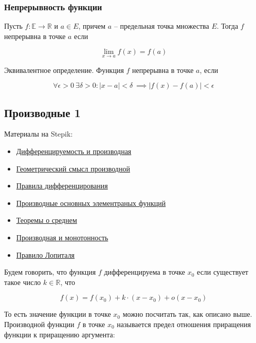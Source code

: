 \documentclass{article}
\begin{document}
\subsubsection{Непрерывность функции}

Пусть $f : \mathbb{E} \to \mathbb{R}$ и $a \in E$, причем $a$ -- предельная точка множества $E$. Тогда $f$ непрерывна в точке $a$ если

$$ \lim\limits_{x \to a} f(x) = f(a) $$

Эквивалентное определение. Функция $f$ непрерывна в точке $a$, если

$$ \forall \epsilon > 0 \ \exists \delta > 0 : |x - a| < \delta \ \implies |f(x) - f(a)| < \epsilon $$

\subsection{Производные 1}

Материалы на Stepik:

\begin{itemize}
	\item \href{https://stepik.org/lesson/28380/step/1}{Дифференцируемость и производная}
	\item \href{https://stepik.org/lesson/28380/step/4}{Геометрический смысл производной}
	\item \href{https://stepik.org/lesson/28380/step/6}{Правила дифференцирования}
	\item \href{https://stepik.org/lesson/28380/step/8}{Производные основных элементраных функций}
	\item \href{https://stepik.org/lesson/28369/step/2}{Теоремы о среднем}
	\item \href{https://stepik.org/lesson/28370/step/1}{Производная и монотонность}
	\item \href{https://stepik.org/lesson/28381/step/1}{Правило Лопиталя}
\end{itemize}

Будем говорить, что функция $f$ дифференцируема в точке $x_0$ если существует такое число $k \in \mathbb{R}$, что

$$ f(x) = f(x_0) + k \cdot (x - x_0) + o(x - x_0) $$

То есть значение функции в точке $x_0$ можно посчитать так, как описано выше. \\

Производной функции $f$ в точке $x_0$ называется предел отношения приращения функции к приращению аргумента:
\end{document}
